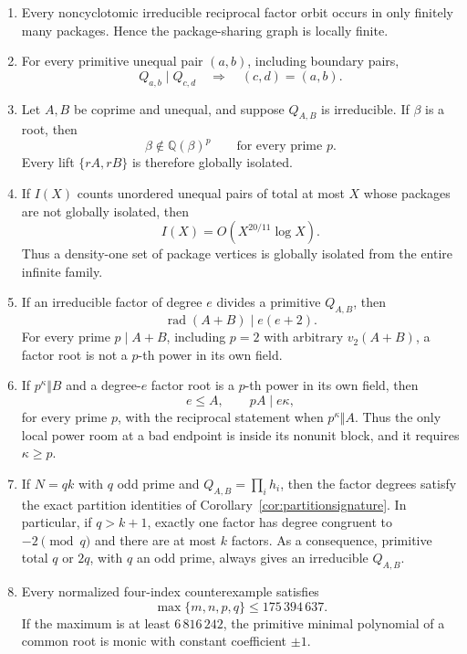 \documentclass[11pt]{article}
\numberwithin{equation}{section}
\theoremstyle{definition}
\newcommand{\Q}{\mathbb Q}
\begin{document}
\begin{enumerate}[label=(\roman*)]
\item Every noncyclotomic irreducible reciprocal factor orbit occurs in only
finitely many packages.  Hence the package-sharing graph is locally finite.

\item For every primitive unequal pair \((a,b)\), including boundary pairs,
\[
 Q_{a,b}\mid Q_{c,d}\quad\Longrightarrow\quad(c,d)=(a,b).
\]

\item Let \(A,B\) be coprime and unequal, and suppose \(Q_{A,B}\) is
irreducible.  If \(\beta\) is a root, then
\[
 \beta\notin\Q(\beta)^p
 \qquad\text{for every prime }p.
\]
Every lift \(\{rA,rB\}\) is therefore globally isolated.

\item If \(I(X)\) counts unordered unequal pairs of total at most \(X\)
whose packages are not globally isolated, then
\[
 I(X)=O\!\left(X^{20/11}\log X\right).
\]
Thus a density-one set of package vertices is globally isolated from the
entire infinite family.

\item If an irreducible factor of degree \(e\) divides a primitive
\(Q_{A,B}\), then
\[
 \operatorname{rad}(A+B)\mid e(e+2).
\]
For every prime \(p\mid A+B\), including \(p=2\) with arbitrary
\(v_2(A+B)\), a factor root is not a \(p\)-th power in its own field.

\item If \(p^\kappa\Vert B\) and a degree-\(e\) factor root is a
\(p\)-th power in its own field, then
\[
 e\leq A,\qquad pA\mid e\kappa,
\]
for every prime \(p\), with the reciprocal statement when
\(p^\kappa\Vert A\).  Thus the only local power room at a bad endpoint is
inside its nonunit block, and it requires \(\kappa\geq p\).

\item If \(N=qk\) with \(q\) odd prime and
\(Q_{A,B}=\prod_i h_i\), then the factor degrees satisfy the exact
partition identities of Corollary~\ref{cor:partitionsignature}.  In
particular, if \(q>k+1\), exactly one factor has degree congruent to
\(-2\pmod q\) and there are at most \(k\) factors.  As a consequence,
primitive total \(q\) or \(2q\), with \(q\) an odd prime, always gives
an irreducible \(Q_{A,B}\).

\item Every normalized four-index counterexample satisfies
\[
 \max\{m,n,p,q\}\leq175\,394\,637.
\]
If the maximum is at least \(6\,816\,242\), the primitive minimal polynomial
of a common root is monic with constant coefficient \(\pm1\).


\end{enumerate}
\end{document}
